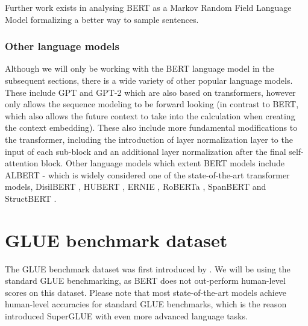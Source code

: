 \documentclass[a4paper,12pt,twoside,openright]{report}
\begin{document}
Further work exists in analysing BERT as a Markov Random Field Language Model \cite{wang19e} formalizing a better way to sample sentences.

\subsubsection{Other language models}

Although we will only be working with the BERT language model in the subsequent sections, there is a wide variety of other popular language models.
These include GPT \cite{radford18} and GPT-2 \cite{radford19} which are also based on transformers, however only allows the sequence modeling to be forward looking (in contrast to BERT, which also allows the future context to take into the calculation when creating the context embedding).
These also include more fundamental modifications to the transformer, including the introduction of layer normalization \cite{ba16} layer to the input of each sub-block and an additional layer normalization after the final self-attention block. 
Other language models which extent BERT models include ALBERT \cite{lan20} - which is widely considered one of the state-of-the-art transformer models, DisilBERT \cite{sanh19}, HUBERT \cite{moradshahi19}, ERNIE \cite{sun19}, RoBERTa \cite{liu19}, SpanBERT \cite{joshi19} and StructBERT \cite{wang19d}.


\section{GLUE benchmark dataset}

The GLUE benchmark dataset was first introduced by \cite{wang19}.
We will be using the standard GLUE benchmarking, as BERT does not out-perform human-level scores on this dataset.
Please note that most state-of-the-art models achieve human-level accuracies for standard GLUE benchmarks, which is the reason \cite{wang19b} introduced SuperGLUE with even more advanced language tasks.
\end{document}
